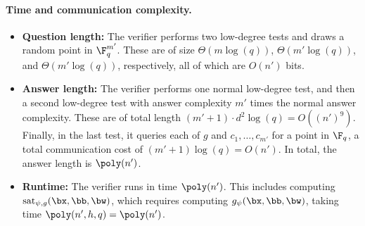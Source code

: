 \paragraph{Time and communication complexity.}
\begin{itemize}
\itemsep -.5pt
\item[$\circ$] \textbf{Question length:} The verifier performs two low-degree tests and draws a random point in $\F_q^{m'}$.
			These are of size $\Theta(m \log(q))$, $\Theta(m'\log(q))$, and $\Theta(m'\log(q))$, respectively,
			all of which are $O(n')$ bits.
\item[$\circ$] \textbf{Answer length:} The verifier performs one normal low-degree test, and then a second low-degree test with answer complexity $m'$ times the normal answer complexity. These are of total length $(m' + 1) \cdot d^2 \log(q) = O((n')^9)$. Finally, in the last test, it queries each of $g$ and $c_1, \ldots, c_{m'}$ for a point in $\F_q$, a total communication cost of $(m'+1) \log(q) = O(n')$. In total, the answer length is $\poly(n')$.
\item[$\circ$] \textbf{Runtime:} The verifier runs in time $\poly(n')$. This includes computing $\mathrm{sat}_{\psi,g}(\bx, \bb, \bw)$,
						which requires computing $g_{\psi}(\bx, \bb, \bw)$, taking time $\poly(n', h, q) = \poly(n')$.
\end{itemize}



